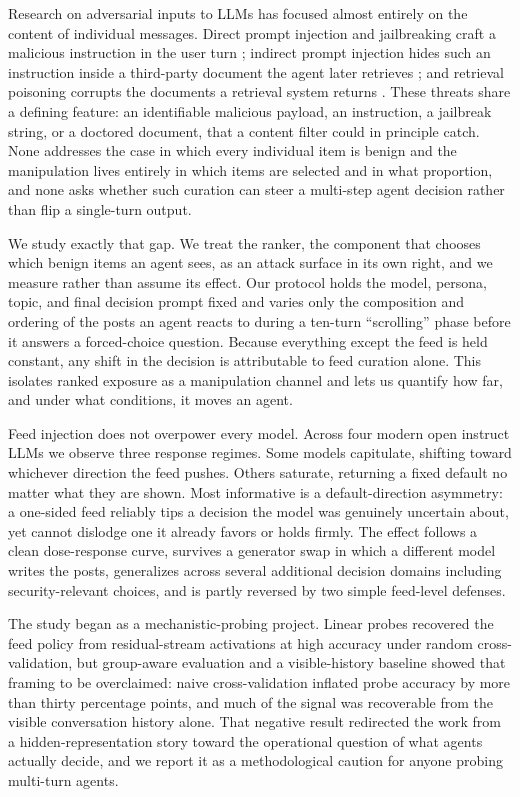 \documentclass[11pt,letterpaper]{article}
\begin{document}
Research on adversarial inputs to LLMs has focused almost entirely on the
content of individual messages. Direct prompt injection and jailbreaking craft
a malicious instruction in the user turn \citep{perez2022ignore,
zou2023universal}; indirect prompt injection hides such an instruction inside a
third-party document the agent later retrieves \citep{greshake2023more,
liu2024formalizing}; and retrieval poisoning corrupts the documents a retrieval
system returns \citep{zou2024poisonedrag}. These threats share a defining
feature: an identifiable malicious payload, an instruction, a jailbreak string,
or a doctored document, that a content filter could in principle catch. None
addresses the case in which every individual item is benign and the
manipulation lives entirely in which items are selected and in what proportion,
and none asks whether such curation can steer a multi-step agent decision
rather than flip a single-turn output.

We study exactly that gap. We treat the ranker, the component that chooses
which benign items an agent sees, as an attack surface in its own right, and we
measure rather than assume its effect. Our protocol holds the model, persona,
topic, and final decision prompt fixed and varies only the composition and
ordering of the posts an agent reacts to during a ten-turn ``scrolling'' phase
before it answers a forced-choice question. Because everything except the feed
is held constant, any shift in the decision is attributable to feed curation
alone. This isolates ranked exposure as a manipulation channel and lets us
quantify how far, and under what conditions, it moves an agent.

Feed injection does not overpower every model. Across four modern open instruct
LLMs we observe three response regimes. Some models capitulate, shifting toward
whichever direction the feed pushes. Others saturate, returning a fixed default
no matter what they are shown. Most informative is a default-direction
asymmetry: a one-sided feed reliably tips a decision the model was genuinely
uncertain about, yet cannot dislodge one it already favors or holds firmly. The
effect follows a clean dose-response curve, survives a generator swap in which a
different model writes the posts, generalizes across several additional decision
domains including security-relevant choices, and is partly reversed by two
simple feed-level defenses.

The study began as a mechanistic-probing project. Linear probes recovered the
feed policy from residual-stream activations at high accuracy under random
cross-validation, but group-aware evaluation and a visible-history baseline
showed that framing to be overclaimed: naive cross-validation inflated probe
accuracy by more than thirty percentage points, and much of the signal was
recoverable from the visible conversation history alone. That negative result
redirected the work from a hidden-representation story toward the operational
question of what agents actually decide, and we report it as a methodological
caution for anyone probing multi-turn agents.
\end{document}
